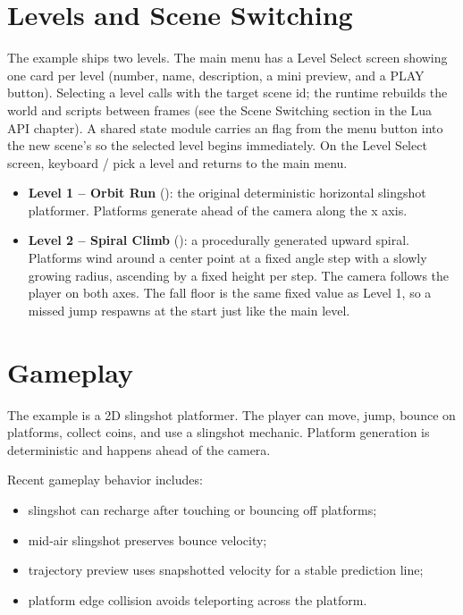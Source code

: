 \section{Levels and Scene Switching}

The example ships two levels. The main menu has a Level Select screen showing one card per level (number, name, description, a mini preview, and a PLAY button). Selecting a level calls  with the target scene id; the runtime rebuilds the world and scripts between frames (see the Scene Switching section in the Lua API chapter). A shared state module carries an  flag from the menu button into the new scene's  so the selected level begins immediately. On the Level Select screen, keyboard / pick a level and  returns to the main menu.

\begin{itemize}
  \item \textbf{Level 1 -- Orbit Run} (): the original deterministic horizontal slingshot platformer. Platforms generate ahead of the camera along the x axis.
  \item \textbf{Level 2 -- Spiral Climb} (): a procedurally generated upward spiral. Platforms wind around a center point at a fixed angle step with a slowly growing radius, ascending by a fixed height per step. The camera follows the player on both axes. The fall floor is the same fixed value as Level 1, so a missed jump respawns at the start just like the main level.
\end{itemize}

\section{Gameplay}

The example is a 2D slingshot platformer. The player can move, jump, bounce on platforms, collect coins, and use a slingshot mechanic. Platform generation is deterministic and happens ahead of the camera.

Recent gameplay behavior includes:

\begin{itemize}
  \item slingshot can recharge after touching or bouncing off platforms;
  \item mid-air slingshot preserves bounce velocity;
  \item trajectory preview uses snapshotted velocity for a stable prediction line;
  \item platform edge collision avoids teleporting across the platform.
\end{itemize}

